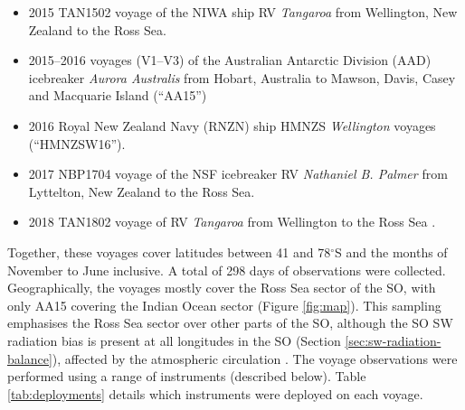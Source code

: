 \begin{itemize}
\item 2015 TAN1502 voyage of the NIWA ship RV \textit{Tangaroa} from Wellington,
New Zealand to the Ross Sea.
\item 2015--2016 voyages (V1--V3) of the Australian Antarctic Division (AAD)
icebreaker \textit{Aurora Australis} from Hobart, Australia to Mawson, Davis,
Casey and Macquarie Island (``AA15'')
\item 2016 Royal New Zealand Navy (RNZN) ship HMNZS \textit{Wellington} voyages
(``HMNZSW16'').
\item 2017 NBP1704 voyage of the NSF icebreaker RV \textit{Nathaniel B. Palmer}
from Lyttelton, New Zealand to the Ross Sea.
\item 2018 TAN1802 voyage of RV \textit{Tangaroa} from Wellington to the Ross
Sea \citep{hartery2019}.
\end{itemize}

Together, these voyages cover latitudes between 41 and 78$^\circ$S and the
months of November to June inclusive. A total of 298 days of observations were
collected. Geographically, the voyages mostly cover the Ross Sea sector of the
SO, with only AA15 covering the Indian Ocean sector (Figure \ref{fig:map}). This
sampling emphasises the Ross Sea sector over other parts of the SO, although the
SO SW radiation bias is present at all longitudes in the SO (Section
\ref{sec:sw-radiation-balance}), affected by the atmospheric circulation
\citep{jones1993,sinclair1994,sinclair1995,simmonds2000,simmonds2003,simmonds2003a,hoskins2005,hodges2011}.
The voyage observations were performed using a range of instruments (described
below). Table \ref{tab:deployments} details which instruments were deployed on
each voyage.


